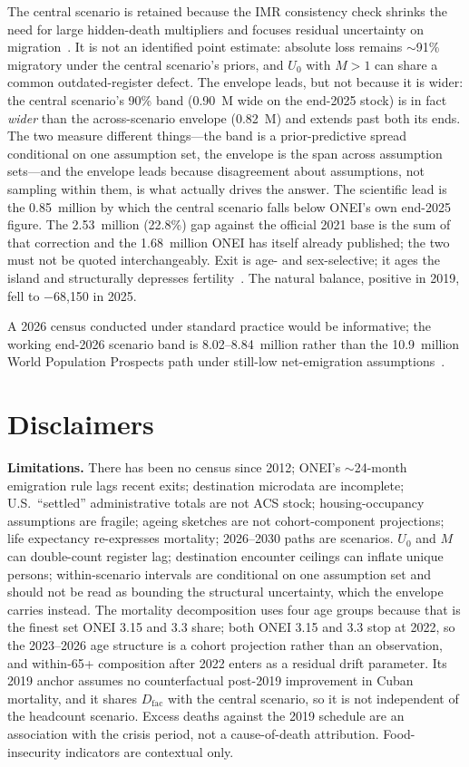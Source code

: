 \documentclass[11pt,a4paper]{article}
\begin{document}
The central scenario is retained because the IMR consistency check shrinks the need for large hidden-death multipliers and focuses residual uncertainty on migration~\citep{pagegarcia2020,modeld}.
It is not an identified point estimate: absolute loss remains $\sim$91\% migratory under the central scenario's priors, and $U_0$ with $M>1$ can share a common outdated-register defect.
The envelope leads, but not because it is wider: the central scenario's 90\% band (0.90~M wide on the end-2025 stock) is in fact \emph{wider} than the across-scenario envelope (0.82~M) and extends past both its ends. The two measure different things---the band is a prior-predictive spread conditional on one assumption set, the envelope is the span across assumption sets---and the envelope leads because disagreement about assumptions, not sampling within them, is what actually drives the answer.
The scientific lead is the 0.85~million by which the central scenario falls below ONEI's own end-2025 figure. The 2.53~million (22.8\%) gap against the official 2021 base is the sum of that correction and the 1.68~million ONEI has itself already published; the two must not be quoted interchangeably.
Exit is age- and sex-selective; it ages the island and structurally depresses fertility~\citep{coleman2006,diazbriquets2014,lee2014}.
The natural balance, positive in 2019, fell to $-$68{,}150 in 2025.

A 2026 census conducted under standard practice would be informative; the working end-2026 scenario band is 8.02--8.84~million rather than the 10.9~million World Population Prospects path under still-low net-emigration assumptions~\citep{un_wpp}.

\section{Disclaimers}

\textbf{Limitations.}
There has been no census since 2012; ONEI's $\sim$24-month emigration rule lags recent exits; destination microdata are incomplete; U.S.\ ``settled'' administrative totals are not ACS stock; housing-occupancy assumptions are fragile; ageing sketches are not cohort-component projections; life expectancy re-expresses mortality; 2026--2030 paths are scenarios.
$U_0$ and $M$ can double-count register lag; destination encounter ceilings can inflate unique persons; within-scenario intervals are conditional on one assumption set and should not be read as bounding the structural uncertainty, which the envelope carries instead.
The mortality decomposition uses four age groups because that is the finest set ONEI 3.15 and 3.3 share; both ONEI 3.15 and 3.3 stop at 2022, so the 2023--2026 age structure is a cohort projection rather than an observation, and within-65+ composition after 2022 enters as a residual drift parameter.
Its 2019 anchor assumes no counterfactual post-2019 improvement in Cuban mortality, and it shares $D_{\mathrm{fac}}$ with the central scenario, so it is not independent of the headcount scenario.
Excess deaths against the 2019 schedule are an association with the crisis period, not a cause-of-death attribution.
Food-insecurity indicators are contextual only.
\end{document}
